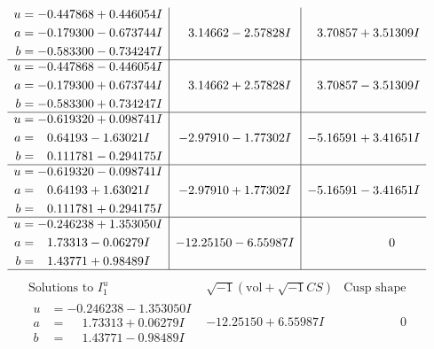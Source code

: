 \documentclass[1p]{elsarticle_modified}
\theoremstyle{definition}
\newcommand{\I}{\sqrt{-1}}
\begin{document}
$$\begin{array}{c|c|c}
\begin{aligned}
u &= -0.447868 + 0.446054 I \\
a &= -0.179300 - 0.673744 I \\
b &= -0.583300 - 0.734247 I\end{aligned}
 & \phantom{-}3.14662 - 2.57828 I & \phantom{-}3.70857 + 3.51309 I \\ \hline\begin{aligned}
u &= -0.447868 - 0.446054 I \\
a &= -0.179300 + 0.673744 I \\
b &= -0.583300 + 0.734247 I\end{aligned}
 & \phantom{-}3.14662 + 2.57828 I & \phantom{-}3.70857 - 3.51309 I \\ \hline\begin{aligned}
u &= -0.619320 + 0.098741 I \\
a &= \phantom{-}0.64193 - 1.63021 I \\
b &= \phantom{-}0.111781 - 0.294175 I\end{aligned}
 & -2.97910 - 1.77302 I & -5.16591 + 3.41651 I \\ \hline\begin{aligned}
u &= -0.619320 - 0.098741 I \\
a &= \phantom{-}0.64193 + 1.63021 I \\
b &= \phantom{-}0.111781 + 0.294175 I\end{aligned}
 & -2.97910 + 1.77302 I & -5.16591 - 3.41651 I \\ \hline\begin{aligned}
u &= -0.246238 + 1.353050 I \\
a &= \phantom{-}1.73313 - 0.06279 I \\
b &= \phantom{-}1.43771 + 0.98489 I\end{aligned}
 & -12.25150 - 6.55987 I & \phantom{-0.000000 } 0\\
 \hline 
 \end{array}$$\newpage$$\begin{array}{c|c|c}  
\text{Solutions to }I^u_{1}& \I (\text{vol} + \sqrt{-1}CS) & \text{Cusp shape}\\
 \hline 
\begin{aligned}
u &= -0.246238 - 1.353050 I \\
a &= \phantom{-}1.73313 + 0.06279 I \\
b &= \phantom{-}1.43771 - 0.98489 I\end{aligned}
 & -12.25150 + 6.55987 I & \phantom{-0.000000 } 0 \\ \hline\begin{aligned}

\end{aligned}
\end{array}$$
\end{document}
